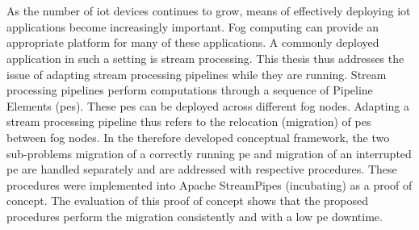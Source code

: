 \thispagestyle{empty}\section*{}

As the number of \acrfull{iot} devices continues to grow, means of effectively deploying \gls{iot} applications become increasingly important. Fog computing can provide an appropriate platform for many of these applications. A commonly deployed application in such a setting is stream processing. This thesis thus addresses the issue of adapting stream processing pipelines while they are running. Stream processing pipelines perform computations through a sequence of Pipeline Elements (\acrshort{pe}s). These \acrshort{pe}s can be deployed across different fog nodes. Adapting a stream processing pipeline thus refers to the relocation (migration) of \acrshort{pe}s between fog nodes. In the therefore developed conceptual framework, the two sub-problems migration of a correctly running \acrshort{pe} and migration of an interrupted \acrshort{pe} are handled separately and are addressed with respective procedures. These procedures were implemented into Apache StreamPipes (incubating) as a proof of concept. The evaluation of this proof of concept shows that the proposed procedures perform the migration consistently and with a low \acrshort{pe} downtime.







